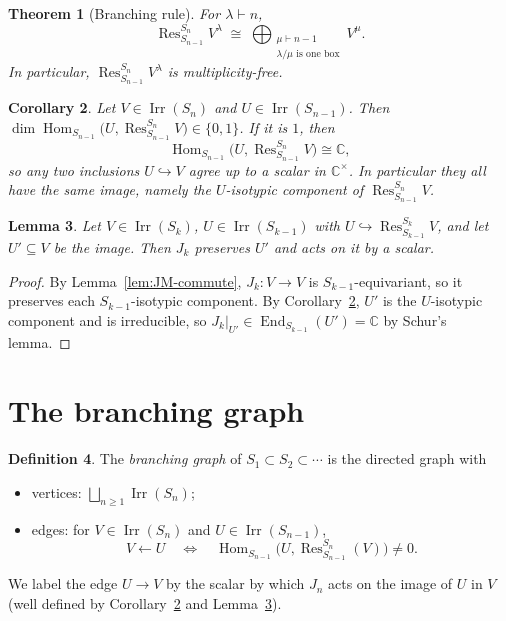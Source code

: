 \documentclass[11pt]{article}
\newtheorem{theorem}{Theorem}[section]
\newtheorem{lemma}[theorem]{Lemma}
\newtheorem{corollary}[theorem]{Corollary}
\theoremstyle{definition}
\newtheorem{definition}[theorem]{Definition}
\theoremstyle{remark}
\newcommand{\C}{\mathbb{C}}
\DeclareMathOperator{\Irr}{Irr}
\DeclareMathOperator{\Res}{Res}
\DeclareMathOperator{\Hom}{Hom}
\DeclareMathOperator{\End}{End}
\newcommand{\into}{\hookrightarrow}
\begin{document}
\begin{theorem}[Branching rule]\label{thm:branching}
For $\lambda\vdash n$,
\[
  \Res^{S_n}_{S_{n-1}} V^\lambda \;\cong\;
  \bigoplus_{\substack{\mu\vdash n-1\\ \lambda/\mu \text{ is one box}}} V^\mu .
\]
In particular, $\Res^{S_n}_{S_{n-1}}V^\lambda$ is multiplicity-free.
\end{theorem}

\begin{corollary}\label{cor:mult-free}
Let $V\in\Irr(S_n)$ and $U\in\Irr(S_{n-1})$. Then
$\dim\Hom_{S_{n-1}}\!\bigl(U,\Res^{S_n}_{S_{n-1}}V\bigr)\in\{0,1\}$. If it is
$1$, then
\[
  \Hom_{S_{n-1}}\!\bigl(U,\Res^{S_n}_{S_{n-1}}V\bigr)\cong\C,
\]
so any two inclusions $U\into V$ agree up to a scalar in $\C^\times$. In
particular they all have the same image, namely the $U$-isotypic component
of $\Res^{S_n}_{S_{n-1}}V$.
\end{corollary}

\begin{lemma}\label{lem:JM-scalar}
Let $V\in\Irr(S_k)$, $U\in\Irr(S_{k-1})$ with $U\into\Res^{S_k}_{S_{k-1}}V$,
and let $U'\subseteq V$ be the image. Then $J_k$ preserves $U'$ and acts on it
by a scalar.
\end{lemma}
\begin{proof}
By Lemma~\ref{lem:JM-commute}, $J_k\colon V\to V$ is
$S_{k-1}$-equivariant, so it preserves each $S_{k-1}$-isotypic component. By
Corollary~\ref{cor:mult-free}, $U'$ is the $U$-isotypic component and is
irreducible, so $J_k|_{U'}\in\End_{S_{k-1}}(U')=\C$ by Schur's lemma.
\end{proof}

\section{The branching graph}

\begin{definition}
The \emph{branching graph} of $S_1\subset S_2\subset\cdots$ is the directed
graph with
\begin{itemize}[nosep]
  \item vertices: $\displaystyle\bigsqcup_{n\ge1}\Irr(S_n)$;
  \item edges: for $V\in\Irr(S_n)$ and $U\in\Irr(S_{n-1})$,
  \[
    V\longleftarrow U
    \quad\iff\quad
    \Hom_{S_{n-1}}\!\bigl(U,\Res^{S_n}_{S_{n-1}}(V)\bigr)\neq 0 .
  \]
\end{itemize}
We label the edge $U\to V$ by the scalar by which $J_n$ acts on the image of
$U$ in $V$ (well defined by Corollary~\ref{cor:mult-free} and
Lemma~\ref{lem:JM-scalar}).
\end{definition}
\end{document}
